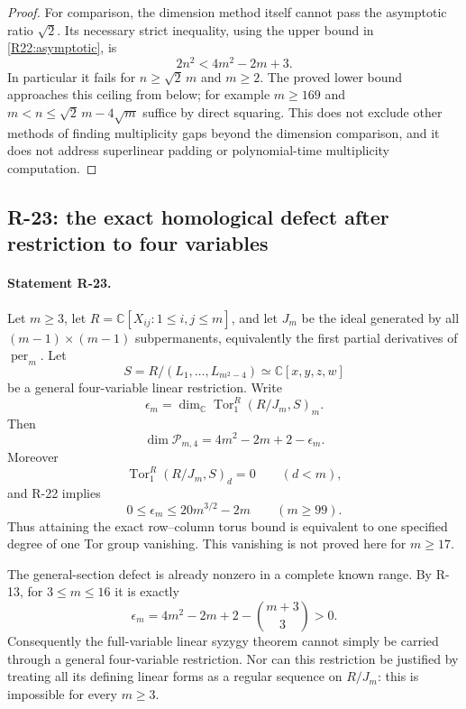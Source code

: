 \documentclass[11pt,a4paper]{article}
\theoremstyle{definition}\newtheorem{definition}{Definition}
\begin{document}
\begin{proof}
For comparison, the dimension method itself cannot pass the
asymptotic ratio $\sqrt2$. Its necessary strict inequality, using
the upper bound in \eqref{R22:asymptotic}, is
\[
 2n^2<4m^2-2m+3.
\]
In particular it fails for $n\geq\sqrt2\,m$ and $m\geq2$.
The proved lower bound approaches this ceiling from below; for
example $m\geq169$ and
$m<n\leq\sqrt2\,m-4\sqrt m$ suffice by direct squaring.
This does not exclude other methods of finding multiplicity gaps
beyond the dimension comparison, and it does not address
superlinear padding or polynomial-time multiplicity computation.
\end{proof}
\subsection{R-23: the exact homological defect after restriction to four variables}

\paragraph{Statement R-23.}
Let $m\geq3$, let $R=\mathbb C[X_{ij}:1\leq i,j\leq m]$, and let
$J_m$ be the ideal generated by all $(m-1)\times(m-1)$
subpermanents, equivalently the first partial derivatives of
$\operatorname{per}_m$. Let
\[
 S=R/(L_1,\ldots,L_{m^2-4})\simeq\mathbb C[x,y,z,w]
\]
be a general four-variable linear restriction. Write
\[
 \epsilon_m=\dim_{\mathbb C}
       \operatorname{Tor}_1^R(R/J_m,S)_m.
\]
Then
\begin{equation}\label{R23:Tor_defect}
 \dim\mathcal P_{m,4}=4m^2-2m+2-\epsilon_m.
\end{equation}
Moreover
\begin{equation}\label{R23:first_degree}
 \operatorname{Tor}_1^R(R/J_m,S)_d=0\qquad(d<m),
\end{equation}
and R-22 implies
\[
 0\leq\epsilon_m\leq20m^{3/2}-2m\qquad(m\geq99).
\]
Thus attaining the exact row--column torus bound is equivalent to one
specified degree of one Tor group vanishing. This vanishing is not
proved here for $m\geq17$.

The general-section defect is already nonzero in a complete known
range. By R-13, for $3\leq m\leq16$ it is exactly
\begin{equation}\label{R23:small_defect}
 \epsilon_m=4m^2-2m+2-\binom{m+3}{3}>0.
\end{equation}
Consequently the full-variable linear syzygy theorem cannot simply be
carried through a general four-variable restriction. Nor can this
restriction be justified by treating all its defining linear forms as
a regular sequence on $R/J_m$: this is impossible for every $m\geq3$.
\end{document}
